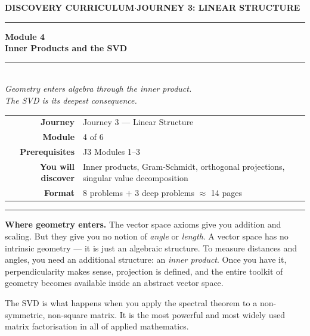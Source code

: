 \documentclass[12pt,a4paper]{article}
\newcounter{problem}
\begin{document}
\thispagestyle{empty}
\begin{center}
{\small\color{MidBlue}\textbf{DISCOVERY CURRICULUM}\quad$\cdot$\quad\textbf{JOURNEY 3: LINEAR STRUCTURE}}
\vspace{0.6cm}

{\color{NavyBlue}\rule{\linewidth}{2pt}}\vspace{0.5cm}

{\Huge\bfseries\color{NavyBlue}Module 4}\\[0.3cm]
{\LARGE\bfseries\color{MidBlue}Inner Products and the SVD}\\[0.4cm]
{\color{Gold}\rule{0.4\linewidth}{1.2pt}}\\[0.4cm]
{\large\itshape\color{DarkGrey}
Geometry enters algebra through the inner product.\\[0.15cm]
The SVD is its deepest consequence.}

\vspace{1cm}
\begin{tabular}{rl}
\color{DarkGrey}\textbf{Journey}         & Journey 3 --- Linear Structure \\[4pt]
\color{DarkGrey}\textbf{Module}          & 4 of 6 \\[4pt]
\color{DarkGrey}\textbf{Prerequisites}   & J3 Modules 1--3 \\[4pt]
\color{DarkGrey}\textbf{You will discover} & Inner products, Gram-Schmidt, orthogonal projections, singular value decomposition \\[4pt]
\color{DarkGrey}\textbf{Format}          & 8 problems $+$ 3 deep problems $\approx$ 14 pages \\
\end{tabular}
\vspace{1cm}

{\color{NavyBlue}\rule{\linewidth}{2pt}}
\end{center}

\vspace{0.5cm}
\noindent\textbf{Where geometry enters.}
The vector space axioms give you addition and scaling. But they give you no notion of \emph{angle} or \emph{length}. A vector space has no intrinsic geometry --- it is just an algebraic structure. To measure distances and angles, you need an additional structure: an \emph{inner product}. Once you have it, perpendicularity makes sense, projection is defined, and the entire toolkit of geometry becomes available inside an abstract vector space.

The SVD is what happens when you apply the spectral theorem to a non-symmetric, non-square matrix. It is the most powerful and most widely used matrix factorisation in all of applied mathematics.
\end{document}
